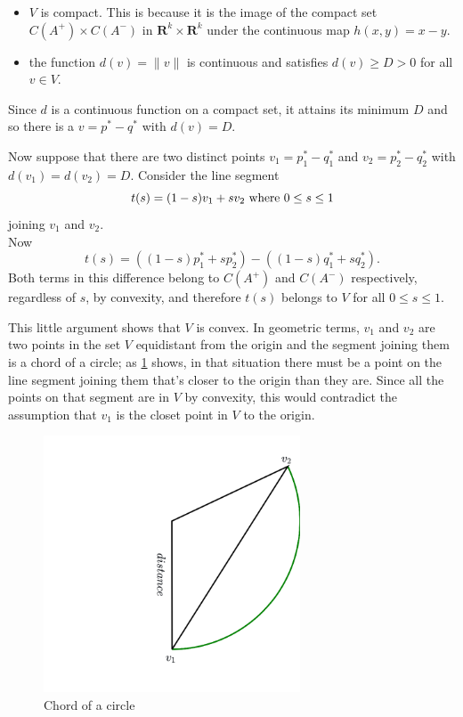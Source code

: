 \documentclass[
  oneside]{scrbook}
\begin{document}
\begin{itemize}
\item
  \(V\) is compact. This is because it is the image of the compact set
  \(C(A^{+})\times C(A^{-})\) in \(\mathbf{R}^{k}\times\mathbf{R}^{k}\)
  under the continuous map \(h(x,y)=x-y\).
\item
  the function \(d(v)=\|v\|\) is continuous and satisfies
  \(d(v)\ge D>0\) for all \(v\in V\).
\end{itemize}

Since \(d\) is a continuous function on a compact set, it attains its
minimum \(D\) and so there is a \(v=p^{*}-q^{*}\) with \(d(v)=D\).

Now suppose that there are two distinct points \(v_1=p_1^*-q_1^*\) and
\(v_2=p_2^*-q_2^*\) with \(d(v_1)=d(v_2)=D\). Consider the line segment
\[
t(s) = (1-s)v_1+sv_2\hbox{ where }0\le s\le 1
\] joining \(v_1\) and \(v_2\).\\
Now \[
t(s) = ((1-s)p_1^*+sp_2^*)-((1-s)q_1^*+sq_2^*).
\] Both terms in this difference belong to \(C(A^{+})\) and \(C(A^{-})\)
respectively, regardless of \(s\), by convexity, and therefore \(t(s)\)
belongs to \(V\) for all \(0\le s\le 1\).

This little argument shows that \(V\) is convex. In geometric terms,
\(v_1\) and \(v_2\) are two points in the set \(V\) equidistant from the
origin and the segment joining them is a chord of a circle; as
\cref{fig:chord} shows, in that situation there must be a point on the
line segment joining them that's closer to the origin than they are.
Since all the points on that segment are in \(V\) by convexity, this
would contradict the assumption that \(v_1\) is the closet point in
\(V\) to the origin.

\begin{figure}
\hypertarget{fig:chord}{%
\centering
\includegraphics[width=3in,height=\textheight]{img/chord2.png}
\caption{Chord of a circle}\label{fig:chord}
}
\end{figure}
\end{document}
